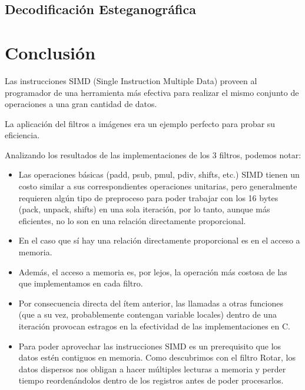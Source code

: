 \documentclass[a4paper,10pt,twoside]{article}
\begin{document}


\subsection{Decodificaci\'on Esteganogr\'afica}







\section{Conclusión}

Las instrucciones SIMD (Single Instruction Multiple Data) proveen al programador de una herramienta más efectiva para realizar el mismo conjunto de operaciones a una gran cantidad de datos.

La aplicación del filtros a imágenes era un ejemplo perfecto para probar su eficiencia.

Analizando los resultados de las implementaciones de los 3 filtros, podemos notar:

\begin{itemize}
\item Las operaciones básicas (padd, psub, pmul, pdiv, shifts, etc.) SIMD tienen un costo similar a sus correspondientes operaciones unitarias, pero generalmente requieren algún tipo de preproceso para poder trabajar con los 16 bytes (pack, unpack, shifts) en una sola iteración, por lo tanto, aunque más eficientes, no lo son en una relación directamente proporcional.
\item En el caso que sí hay una relación directamente proporcional es en el acceso a memoria.
\item Además, el acceso a memoria es, por lejos, la operación más costosa de las que implementamos en cada filtro.
\item Por consecuencia directa del ítem anterior, las llamadas a otras funciones (que a su vez, probablemente contengan variable locales) dentro de una iteración provocan estragos en la efectividad de las implementaciones en C.
\item Para poder aprovechar las instrucciones SIMD es un prerequisito que los datos estén contiguos en memoria. Como descubrimos con el filtro Rotar, los datos dispersos nos obligan a hacer múltiples lecturas a memoria y perder tiempo reordenándolos dentro de los registros antes de poder procesarlos.
\end{itemize}
\end{document}

